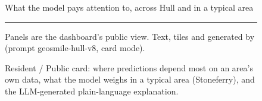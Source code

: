 \begin{figure}[!htbp]
\begin{tcolorbox}[enhanced, colback=white, colframe=cardRule, arc=3mm, boxrule=0.6pt,
                  left=3mm, right=3mm, top=2.5mm, bottom=2.5mm, before skip=0pt, after skip=2pt,
                  fontupper=\sffamily\normalsize\color{cardInk}]
\setlength{\parskip}{0pt}\raggedright%
\par\smallskip
{\color{cardMuted}What the model pays attention to, across Hull and in a typical area}\par\vspace{4pt}
\begin{minipage}[t]{0.45\linewidth}\vspace{0pt}
\end{minipage}\hfill
\begin{minipage}[t]{0.52\linewidth}\vspace{0pt}
\end{minipage}\par\vspace{4pt}
\par\vspace{2pt}
\noindent\cardTileA\hfill\cardTileB\hfill\cardTileC\hfill\cardTileD\par\vspace{6pt}
\begin{minipage}[t]{0.485\linewidth}\vspace{0pt}\raggedright
  \par\vspace{2pt}
  \cardSecA\par
\end{minipage}\hfill
\begin{minipage}[t]{0.485\linewidth}\vspace{0pt}\raggedright
  \par\vspace{2pt}
  \cardSecB\par
\end{minipage}\par\vspace{4pt}
{\color{cardRule}\rule{\linewidth}{0.4pt}}\par\vspace{1pt}
{\color{cardMuted}\footnotesize \cardFooter{} Panels are the dashboard's public view. Text, tiles
and  generated by \cardModel{} (prompt geosmile-hull-v8, card mode).\par}
\end{tcolorbox}
\caption{Resident / Public card: where predictions depend most on an area's own data, what the
model weighs in a typical area (Stoneferry), and the LLM-generated plain-language explanation.}
\label{fig:stakeholder-public}
\end{figure}
